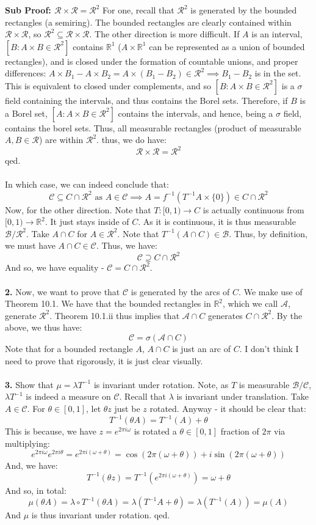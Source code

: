 \documentclass[12pt,a4paper]{article}
\newcommand{\1}[1]{\mathbbm{1}\left\{ #1 \right\}}
\newcommand{\R}{\mathbb{R}}
\newcommand{\acal}{\mathcal{A}}
\newcommand{\ccal}{\mathcal{C}}
\newcommand{\bcal}{\mathcal{B}}
\newcommand{\rcal}{\mathcal{R}}
\begin{document}
\textbf{Sub Proof: $\rcal \times \rcal = \rcal^2$} For one, recall that $\rcal^2$ is generated by the bounded rectangles (a semiring). The bounded rectangles are clearly contained within $\rcal \times \rcal$, so $\rcal^2 \subseteq \rcal \times \rcal$. The other direction is more difficult. If $A$ is an interval, $[B : A \times B \in \rcal^2]$ contains $\R^1$ ($A \times \R^1$ can be represented as a union of bounded rectangles), and is closed under the formation of countable unions, and proper differences: $A \times B_1 - A \times B_2 = A \times (B_1 - B_2) \in \rcal^2 \implies B_1 - B_2$ is in the set. This is equivalent to closed under complements, and so $[B : A \times B \in \rcal^2]$ is a $\sigma$ field containing the intervals, and thus contains the Borel sets. Therefore, if $B$ is a Borel set, $[A: A \times B \in \rcal^2]$ contains the intervals, and hence, being a $\sigma$ field, contains the borel sets. Thus, all measurable rectangles (product of measurable $A,B \in \rcal$) are within $\rcal^2$. thus, we do have:
$$
	\rcal \times \rcal = \rcal^2
$$
qed.
\\\\
In which case, we can indeed conclude that:
$$
	\ccal \subseteq C \cap \rcal^2 \text{ as $A \in \ccal \implies A = f^{-1}(T^{-1}A \times \{0\}) \in C \cap \rcal^2$}
$$
Now, for the other direction. Note that $T: [0,1) \to C$ is actually continuous from $[0,1) \to \R^2$. It just stays inside of $C$. As it is continuous, it is thus measurable $\bcal/\rcal^2$. Take $A \cap C$ for $A \in \rcal^2$. Note that $T^{-1}(A \cap C) \in \bcal$. Thus, by definition, we must have $A \cap C \in \ccal$. Thus, we have:
$$
	\ccal \supseteq C \cap \rcal^2
$$
And so, we have equality - $\ccal = C \cap \rcal^2$.
\\\\
\textbf{2.} Now, we want to prove that $\ccal$ is generated by the arcs of $C$. We make use of Theorem 10.1. We have that the bounded rectangles in $\R^2$, which we call $\acal$, generate $\rcal^2$. Theorem 10.1.ii thus implies that $\acal \cap C$ generates $C \cap \rcal^2$. By the above, we thus have:
$$
	\ccal = \sigma(\acal \cap C)
$$
Note that for a bounded rectangle $A$, $A \cap C$ is just an arc of $C$. I don't think I need to prove that rigorously, it is just clear visually.
\\\\
\textbf{3.} Show that $\mu = \lambda T^{-1}$ is invariant under rotation. Note, as $T$ is measurable $\bcal/\ccal$, $\lambda T^{-1}$ is indeed a measure on $\ccal$. Recall that $\lambda$ is invariant under translation. Take $A \in \ccal$. For $\theta \in [0,1]$, let $\theta z$ just be $z$ rotated. Anyway - it should be clear that:
$$
	T^{-1}(\theta A) = T^{-1}(A) + \theta
$$
This is because, we have $z = e^{2\pi i \omega}$ is rotated a $\theta \in [0,1]$ fraction of $2\pi$ via multiplying:
$$
	e^{2\pi i \omega}e^{2\pi i\theta} = e^{2\pi i(\omega + \theta)} = \cos(2\pi(\omega + \theta)) + i\sin(2\pi(\omega + \theta))
$$
And, we have:
$$
	T^{-1}(\theta z) = T^{-1}(e^{2\pi i(\omega + \theta)}) = \omega + \theta
$$
And so, in total:
$$
	\mu(\theta A) =
	\lambda \circ T^{-1}(\theta A) =
	\lambda (T^{-1}A + \theta) = 
	\lambda(T^{-1}(A)) = \mu(A)
$$
And $\mu$ is thus invariant under rotation. qed.
\end{document}
